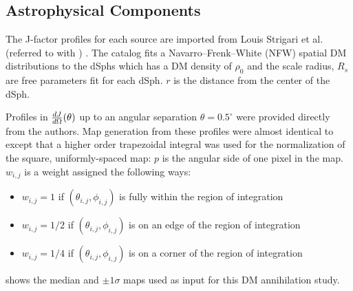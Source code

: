 \subsection{\J Astrophysical Components}\label{sec:mtd_spatialmodel}

The J-factor profiles for each source are imported from Louis Strigari et al. (referred to with \LS) \cite{DM_Strigari20}.
The \LS catalog fits a Navarro–Frenk–White (NFW) \cite{NFWProfile} spatial DM distributions to the dSphs which has a DM density of
\nfwProfile
$\rho_0$ and the scale radius, $R_s$ are free parameters fit for each dSph.
$r$ is the distance from the center of the dSph.

Profiles in $\frac{dJ}{d\Omega} (\theta)$ up to an angular separation $\theta = 0.5^{\circ}$ were provided directly from the authors.
Map generation from these profiles were almost identical to  except that a higher order trapezoidal integral was used for the normalization of the square, uniformly-spaced map:
\TrapIntegral
$p$ is the angular side of one pixel in the map.
$w_{i,j}$ is a weight assigned the following ways:
\begin{itemize}
    \item[] $w_{i,j} = 1$ if $(\theta_{i,j}, \phi_{i,j})$ is fully within the region of integration
    \item[] $w_{i,j} = 1/2$ if $(\theta_{i,j}, \phi_{i,j})$ is on an edge of the region of integration
    \item[] $w_{i,j} = 1/4$ if $(\theta_{i,j}, \phi_{i,j})$ is on a corner of the region of integration
\end{itemize}
 shows the median and $\pm1\sigma$ maps used as input for this DM annihilation study.

